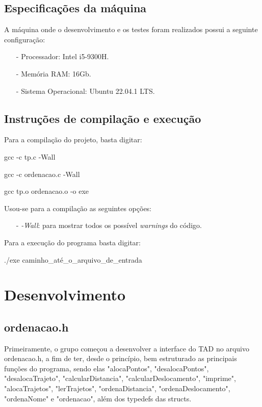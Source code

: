 \documentclass{article}
\begin{document}
\subsection{Especificações da máquina}
    A máquina onde o desenvolvimento e os testes foram realizados possui a seguinte configuração:
    \begin{itemize}
        \item[-] Processador: Intel i5-9300H.
        \item[-] Memória RAM: 16Gb.
        \item[-] Sistema Operacional: Ubuntu 22.04.1 LTS.
    \end{itemize}

\subsection{Instruções de compilação e execução}
    
    Para a compilação do projeto, basta digitar:
    
    \begin{tcolorbox}[title=Compilando o projeto,width=\linewidth]
        \par gcc -c tp.c -Wall
        \par gcc -c ordenacao.c -Wall
        \par gcc tp.o ordenacao.o -o exe

    \end{tcolorbox}
    
    Usou-se para a compilação as seguintes opções:
    \begin{itemize}
        \item [-] \emph{-Wall}: para mostrar todos os possível \emph{warnings} do código.
    \end{itemize}
    
    Para a execução do programa basta digitar:
    \begin{tcolorbox}[title=,width=\linewidth]
        ./exe caminho\_até\_o\_arquivo\_de\_entrada
    \end{tcolorbox}

\clearpage

\section{Desenvolvimento}

\subsection{ordenacao.h}
    \par Primeiramente, o grupo começou a desenvolver a interface do TAD no arquivo ordenacao.h, a fim de ter, desde o princípio, bem estruturado as principais funções do programa, sendo elas "alocaPontos", "desalocaPontos", "desalocaTrajeto", "calcularDistancia", "calcularDeslocamento", "imprime", "alocaTrajetos", "lerTrajetos", "ordenaDistancia", "ordenaDeslocamento", "ordenaNome" e "ordenacao", além dos typedefs das structs.
    
\end{document}
